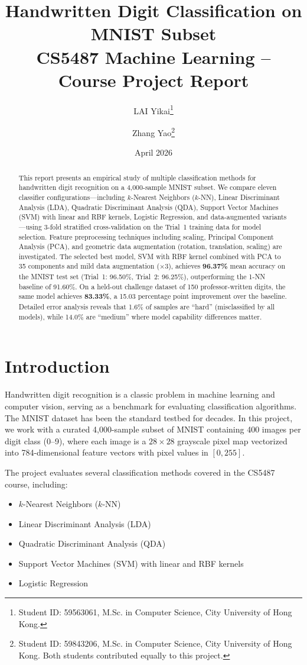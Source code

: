 \documentclass[11pt,a4paper,twocolumn]{article}
\title{\textbf{Handwritten Digit Classification on MNIST Subset}\\
\large CS5487 Machine Learning -- Course Project Report}
\author{LAI Yikai\thanks{Student ID: 59563061, M.Sc. in Computer Science, City University of Hong Kong.} \and Zhang Yao\thanks{Student ID: 59843206, M.Sc. in Computer Science, City University of Hong Kong. Both students contributed equally to this project.}}
\date{April 2026}
\begin{document}
\maketitle

\begin{abstract}
This report presents an empirical study of multiple classification methods for handwritten digit recognition on a 4,000-sample MNIST subset. We compare eleven classifier configurations---including $k$-Nearest Neighbors ($k$-NN), Linear Discriminant Analysis (LDA), Quadratic Discriminant Analysis (QDA), Support Vector Machines (SVM) with linear and RBF kernels, Logistic Regression, and data-augmented variants---using 3-fold stratified cross-validation on the Trial~1 training data for model selection. Feature preprocessing techniques including scaling, Principal Component Analysis (PCA), and geometric data augmentation (rotation, translation, scaling) are investigated. The selected best model, SVM with RBF kernel combined with PCA to 35 components and mild data augmentation ($\times$3), achieves \textbf{96.37\%} mean accuracy on the MNIST test set (Trial~1: 96.50\%, Trial~2: 96.25\%), outperforming the 1-NN baseline of 91.60\%. On a held-out challenge dataset of 150 professor-written digits, the same model achieves \textbf{83.33\%}, a 15.03 percentage point improvement over the baseline. Detailed error analysis reveals that 1.6\% of samples are ``hard'' (misclassified by all models), while 14.0\% are ``medium'' where model capability differences matter.
\end{abstract}

\section{Introduction}

Handwritten digit recognition is a classic problem in machine learning and computer vision, serving as a benchmark for evaluating classification algorithms. The MNIST dataset \cite{lecun1998gradient} has been the standard testbed for decades. In this project, we work with a curated 4,000-sample subset of MNIST containing 400 images per digit class (0--9), where each image is a $28 \times 28$ grayscale pixel map vectorized into 784-dimensional feature vectors with pixel values in $[0, 255]$.

The project evaluates several classification methods covered in the CS5487 course, including:
\begin{itemize}[noitemsep]
    \item $k$-Nearest Neighbors ($k$-NN)
    \item Linear Discriminant Analysis (LDA)
    \item Quadratic Discriminant Analysis (QDA)
    \item Support Vector Machines (SVM) with linear and RBF kernels
    \item Logistic Regression
\end{itemize}
\end{document}
